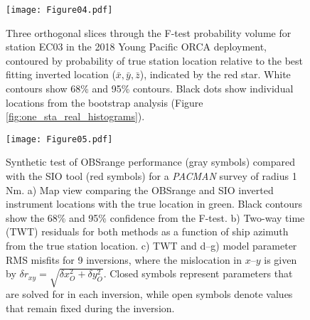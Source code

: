 \begin{figure}[h]
\texttt{[image: Figure04.pdf]}
\caption{ Three orthogonal slices through the F-test probability volume for station EC03 in the 2018 Young Pacific ORCA deployment, contoured by probability of true station location relative to the best fitting inverted location ($\bar{x},\bar{y},\bar{z}$), indicated by the red star. White contours show 68\% and 95\% contours. Black dots show individual locations from the bootstrap analysis (Figure \ref{fig:one_sta_real_histograms}). }
\label{fig:one_sta_real_ftests}
\end{figure}



\begin{figure}[h]
\texttt{[image: Figure05.pdf]}
\caption{ Synthetic test of OBSrange performance (gray symbols) compared with the SIO tool (red symbols) for a \textit{PACMAN} survey of radius 1 Nm. a) Map view comparing the OBSrange and SIO inverted instrument locations with the true location in green. Black contours show the 68\% and 95\% confidence from the F-test. b) Two-way time (TWT) residuals for both methods as a function of ship azimuth from the true station location. c) TWT and d--g) model parameter RMS misfits for 9 inversions, where the mislocation in $x$--$y$ is given by $\delta r_{xy} = \sqrt{\delta x_{O}^2 + \delta y_{O}^2} $. Closed symbols represent parameters that are solved for in each inversion, while open symbols denote values that remain fixed during the inversion.}
\label{fig:compare_tool}
\end{figure}

